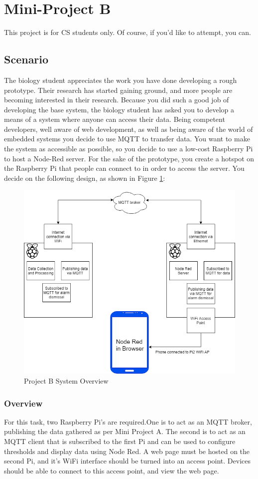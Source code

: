 \section{Mini-Project B}
This project is for CS students only. Of course, if you'd like to attempt, you can.\\

\subsection{Scenario}
The biology student appreciates the work you have done developing a rough prototype. Their research has started gaining ground, and more people are becoming interested in their research. Because you did such a good job of developing the base system, the biology student has asked you to develop a means of a system where anyone can access their data. Being competent developers, well aware of web development, as well as being aware of the world of embedded systems you decide to use MQTT to transfer data. You want to make the system as accessible as possible, so you decide to use a low-cost Raspberry Pi to host a Node-Red server. For the sake of the prototype, you create a hotspot on the Raspberry Pi that people can connect to in order to access the server. You decide on the following design, as shown in Figure \ref{fig:NodeRed}:

\begin{figure}[H]
\centering
\includegraphics[width=0.8\columnwidth]{Figures/NodeRed}
\caption{Project B System Overview}
\label{fig:NodeRed}
\end{figure}

\subsubsection{Overview}
For this task, two Raspberry Pi's are required.One is to act as an MQTT broker, publishing the data gathered as per Mini Project A. The second is to act as an MQTT client that is subscribed to the first Pi and can be used to configure thresholds and display data using Node Red. A web page must be hosted on the second Pi, and it's WiFi interface should be turned into an access point. Devices should be able to connect to this access point, and view the web page.

